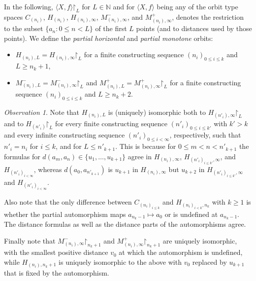 \documentclass[10pt,a4paper]{article}
\theoremstyle{definition}
\theoremstyle{remark}
\newtheorem{observation}[tw]{Observation}
\newcommand \set [1]{\{#1\}}
\newcommand \seq [1]{\langle #1 \rangle}
\newcommand \restr [1] {\mathord{\upharpoonright}_{#1}}
\newcommand \N {\mathbb{N}}
\begin{document}
In the following, $\seq{X, f}\restr{L}$ for $L \in \N$ and for $\seq{X, f}$ being any of the orbit type spaces $C_{(n_i)}$, $H_{(n_i)}$, $H_{(n_i),\infty}$, $M^-_{(n_i),\infty}$, and $M^+_{(n_i),\infty}$, denotes the restriction to the subset $\set{a_n: 0 \leq n < L}$ of the first $L$ points (and to distances used by those points).
We define the \emph{partial horizontal} and \emph{partial monotone} orbits:
\begin{itemize}
    \item $H_{(n_i), L} = H_{(n_i), \infty}\restr{L}$ for a finite constructing sequence $(n_i)_{0 \leq i \leq k}$ and $L \geq n_k + 1$,
    \item $M^-_{(n_i), L} = M^-_{(n_i), \infty}\restr{L}$ and $M^+_{(n_i), L} = M^+_{(n_i), \infty}\restr{L}$ for a finite constructing sequence $(n_i)_{0 \leq i \leq k}$ and $L \geq n_k + 2$.
\end{itemize}

\begin{observation} \label{obs:orbit_restrictions_isomorphic}
    Note that $H_{(n_i), L}$ is (uniquely) isomorphic both to $H_{(n'_i), \infty}\restr{L}$ and to $H_{(n'_i)}\restr{L}$ for every finite constructing sequence $(n'_i)_{0\leq i \leq k'}$ with $k' > k$ and every infinite constructing sequence $(n'_i)_{0\leq i < \infty}$, respectively, such that $n'_i = n_i$ for $i \leq k$, and for $L \leq n'_{k + 1}$.
    This is because for $0 \leq m < n < n'_{k + 1}$ the formulas for $d(a_m, a_n) \in \set{u_1, \ldots, u_{k + 1}}$ agree in $H_{(n_i), \infty}$, $H_{(n'_i)_{i\leq k'}, \infty}$, and $H_{(n'_i)_{i<\infty}}$, whereas $d(a_0, a_{n'_{k + 1}})$ is $u_{k + 1}$ in $H_{(n_i), \infty}$ but $u_{k + 2}$ in $H_{(n'_i)_{i\leq k'}, \infty}$ and $H_{(n'_i)_{i < \infty}}$.

    
    Also note that the only difference between $C_{(n_i)_{i\leq k}}$ and $H_{(n_i)_{i < k}, n_k}$ with $k \geq 1$ is whether the partial automorphism maps $a_{n_k - 1} \mapsto a_0$ or is undefined at $a_{n_k - 1}$.
    The distance formulas as well as the distance parts of the automorphisms agree.

    Finally note that $M^-_{(n_i),\infty}\restr{n_k + 1}$ and $M^+_{(n_i),\infty}\restr{n_k + 1}$ are uniquely isomorphic, with the smallest positive distance $v_0$ at which the automorphism is undefined, while $H_{(n_i), n_k + 1}$ is uniquely isomorphic to the above with $v_0$ replaced by $u_{k + 1}$ that is fixed by the automorphism.
    
\end{observation}
\end{document}
